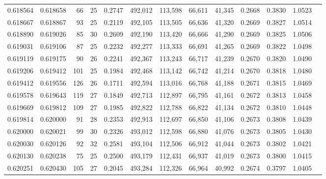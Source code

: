 \begin{tabular}{rrrrrrrrrrrrr}
0.618564 & 0.618658 &     66 &    25 &                                     0.2747 & 492,012 & 113,598 &  66,611 &  41,345 & 0.2668 & 0.3830 & 1.0523 \\
0.618667 & 0.618867 &     93 &    25 &                                     0.2119 & 492,105 & 113,505 &  66,636 &  41,320 & 0.2669 & 0.3827 & 1.0514 \\
0.618890 & 0.619026 &     85 &    30 &                                     0.2609 & 492,190 & 113,420 &  66,666 &  41,290 & 0.2669 & 0.3825 & 1.0506 \\
0.619031 & 0.619106 &     87 &    25 &                                     0.2232 & 492,277 & 113,333 &  66,691 &  41,265 & 0.2669 & 0.3822 & 1.0498 \\
0.619119 & 0.619175 &     90 &    26 &                                     0.2241 & 492,367 & 113,243 &  66,717 &  41,239 & 0.2670 & 0.3820 & 1.0490 \\
0.619206 & 0.619412 &    101 &    25 &                                     0.1984 & 492,468 & 113,142 &  66,742 &  41,214 & 0.2670 & 0.3818 & 1.0480 \\
0.619412 & 0.619556 &    126 &    26 &                                     0.1711 & 492,594 & 113,016 &  66,768 &  41,188 & 0.2671 & 0.3815 & 1.0469 \\
0.619578 & 0.619643 &    119 &    27 &                                     0.1849 & 492,713 & 112,897 &  66,795 &  41,161 & 0.2672 & 0.3813 & 1.0458 \\
0.619669 & 0.619812 &    109 &    27 &                                     0.1985 & 492,822 & 112,788 &  66,822 &  41,134 & 0.2672 & 0.3810 & 1.0448 \\
0.619814 & 0.620000 &     91 &    28 &                                     0.2353 & 492,913 & 112,697 &  66,850 &  41,106 & 0.2673 & 0.3808 & 1.0439 \\
0.620000 & 0.620021 &     99 &    30 &                                     0.2326 & 493,012 & 112,598 &  66,880 &  41,076 & 0.2673 & 0.3805 & 1.0430 \\
0.620030 & 0.620126 &     92 &    32 &                                     0.2581 & 493,104 & 112,506 &  66,912 &  41,044 & 0.2673 & 0.3802 & 1.0421 \\
0.620130 & 0.620238 &     75 &    25 &                                     0.2500 & 493,179 & 112,431 &  66,937 &  41,019 & 0.2673 & 0.3800 & 1.0415 \\
0.620251 & 0.620430 &    105 &    27 &                                     0.2045 & 493,284 & 112,326 &  66,964 &  40,992 & 0.2674 & 0.3797 & 1.0405 \\

\end{tabular}
